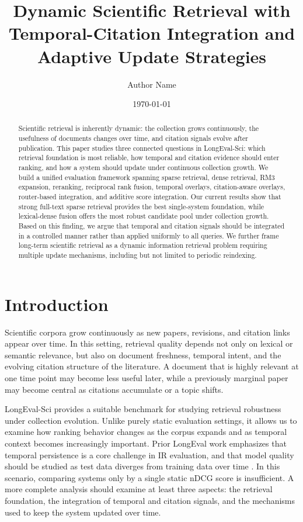 \documentclass[11pt]{article}
\title{Dynamic Scientific Retrieval with Temporal-Citation Integration and Adaptive Update Strategies}
\author{Author Name}
\date{\today}
\begin{document}
\maketitle

\begin{abstract}
Scientific retrieval is inherently dynamic: the collection grows continuously, the usefulness of documents changes over time, and citation signals evolve after publication. This paper studies three connected questions in LongEval-Sci: which retrieval foundation is most reliable, how temporal and citation evidence should enter ranking, and how a system should update under continuous collection growth. We build a unified evaluation framework spanning sparse retrieval, dense retrieval, RM3 expansion, reranking, reciprocal rank fusion, temporal overlays, citation-aware overlays, router-based integration, and additive score integration. Our current results show that strong full-text sparse retrieval provides the best single-system foundation, while lexical-dense fusion offers the most robust candidate pool under collection growth. Based on this finding, we argue that temporal and citation signals should be integrated in a controlled manner rather than applied uniformly to all queries. We further frame long-term scientific retrieval as a dynamic information retrieval problem requiring multiple update mechanisms, including but not limited to periodic reindexing.
\end{abstract}

\section{Introduction}

Scientific corpora grow continuously as new papers, revisions, and citation links appear over time. In this setting, retrieval quality depends not only on lexical or semantic relevance, but also on document freshness, temporal intent, and the evolving citation structure of the literature. A document that is highly relevant at one time point may become less useful later, while a previously marginal paper may become central as citations accumulate or a topic shifts.

LongEval-Sci provides a suitable benchmark for studying retrieval robustness under collection evolution. Unlike purely static evaluation settings, it allows us to examine how ranking behavior changes as the corpus expands and as temporal context becomes increasingly important. Prior LongEval work emphasizes that temporal persistence is a core challenge in IR evaluation, and that model quality should be studied as test data diverges from training data over time \cite{cancellieri_longeval_2025}. In this scenario, comparing systems only by a single static nDCG score is insufficient. A more complete analysis should examine at least three aspects: the retrieval foundation, the integration of temporal and citation signals, and the mechanisms used to keep the system updated over time.
\end{document}
